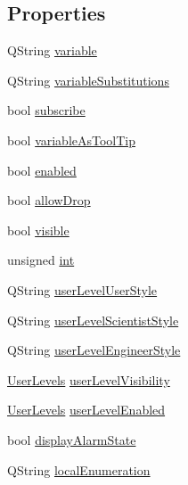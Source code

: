 \subsection*{Properties}
\begin{DoxyCompactItemize}
\item 
QString \hyperlink{classQEComboBox_a6a0aa7f7d106b8133ea2711a9b93044c}{variable}
\item 
QString \hyperlink{classQEComboBox_a0a2d3ae0138aab89bddf83f759049766}{variableSubstitutions}
\item 
bool \hyperlink{classQEComboBox_af1bedb9843c0b2181dfcd432d2b41a5c}{subscribe}
\item 
bool \hyperlink{classQEComboBox_a25221727ff1f7f11a4805dbced197e8e}{variableAsToolTip}
\item 
bool \hyperlink{classQEComboBox_a0e38f748ae89b5b0a9d28ceb60f892a3}{enabled}
\item 
bool \hyperlink{classQEComboBox_ade82bed66e34eeda215eebdb8a394d96}{allowDrop}
\item 
bool \hyperlink{classQEComboBox_a4c0cb5db5c7c6e8da384a566b533273f}{visible}
\item 
unsigned \hyperlink{classQEComboBox_a1effaba9e0a9e69b0d4fa83eaa64ec22}{int}
\item 
QString \hyperlink{classQEComboBox_ae2ebc0d3d576e06f696110e8395de642}{userLevelUserStyle}
\item 
QString \hyperlink{classQEComboBox_a75af85e06871bc7127e592bc08e26804}{userLevelScientistStyle}
\item 
QString \hyperlink{classQEComboBox_a81ad676e362ee95ebe5e5ec1caa7deb3}{userLevelEngineerStyle}
\item 
\hyperlink{classQEComboBox_a7da014f2f323780d302cdf17ff2a5fa8}{UserLevels} \hyperlink{classQEComboBox_a4f08d8c6154291f534153a6c195be8de}{userLevelVisibility}
\item 
\hyperlink{classQEComboBox_a7da014f2f323780d302cdf17ff2a5fa8}{UserLevels} \hyperlink{classQEComboBox_af06e9e0b1aaa71c0ceca408ecb9d1a88}{userLevelEnabled}
\item 
bool \hyperlink{classQEComboBox_a72bca9ee7c0ea6272db17ae5a4268c53}{displayAlarmState}
\item 
QString \hyperlink{classQEComboBox_a3a1601a6a26ba3df3f730974a7002ed8}{localEnumeration}
\end{DoxyCompactItemize}


